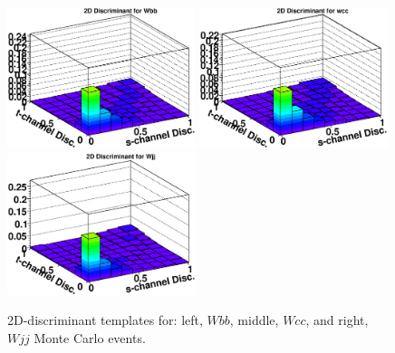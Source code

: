 \begin{figure}[!h!tbp]
\includegraphics[width=0.49\textwidth]
{eps/MatrixElement/performance/2D-Discriminant_wbb}
\includegraphics[width=0.49\textwidth]
{eps/MatrixElement/performance/2D-Discriminant_wcc}
\includegraphics[width=0.49\textwidth]
{eps/MatrixElement/performance/2D-Discriminant_wjj}
\vspace{-0.1in}
\caption{2D-discriminant templates for: left,
$Wbb$, middle, $Wcc$, and right, $Wjj$ Monte Carlo events.}
\label{wbbwccwjj}
\end{figure}

